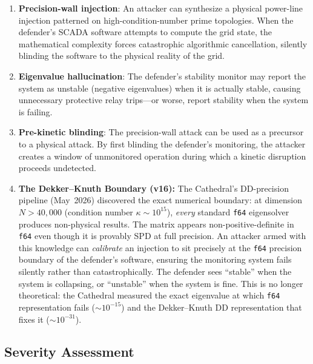 \documentclass[11pt,a4paper]{article}
\begin{document}
\begin{enumerate}
  \item \textbf{Precision-wall injection}: An attacker can synthesize
    a physical power-line injection patterned on high-condition-number
    prime topologies. When the defender's SCADA software attempts to
    compute the grid state, the mathematical complexity forces
    catastrophic algorithmic cancellation, silently blinding the
    software to the physical reality of the grid.

  \item \textbf{Eigenvalue hallucination}: The defender's stability
    monitor may report the system as unstable (negative eigenvalues)
    when it is actually stable, causing unnecessary protective relay
    trips---or worse, report stability when the system is failing.

  \item \textbf{Pre-kinetic blinding}: The precision-wall attack can
    be used as a precursor to a physical attack. By first blinding
    the defender's monitoring, the attacker creates a window of
    unmonitored operation during which a kinetic disruption proceeds
    undetected.

  \item \textbf{The Dekker--Knuth Boundary (v16):} The Cathedral's
    DD-precision pipeline (May~2026) discovered the exact numerical
    boundary: at dimension $N > 40{,}000$ (condition number
    $\kappa \sim 10^{15}$), \emph{every} standard \texttt{f64}
    eigensolver produces non-physical results. The matrix appears
    non-positive-definite in \texttt{f64} even though it is provably
    SPD at full precision. An attacker armed with this knowledge can
    \emph{calibrate} an injection to sit precisely at the \texttt{f64}
    precision boundary of the defender's software, ensuring the
    monitoring system fails silently rather than catastrophically.
    The defender sees ``stable'' when the system is collapsing,
    or ``unstable'' when the system is fine. This is no longer
    theoretical: the Cathedral measured the exact eigenvalue at
    which \texttt{f64} representation fails ($\sim 10^{-15}$) and the
    Dekker--Knuth DD representation that fixes it ($\sim 10^{-31}$).
\end{enumerate}

\subsection{Severity Assessment}
\end{document}
